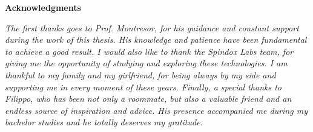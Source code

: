 \thispagestyle{empty}

\begin{center}
  {\bf \Huge Acknowledgments}
\end{center}

\vspace{4cm}


\emph{
The first thanks goes to Prof. Montresor, for his guidance and constant support during the work of this thesis. His knowledge and patience have been fundamental to achieve a good result. I would also like to thank the Spindox Labs team, for giving me the opportunity of studying and exploring these technologies. I am thankful to my family and my girlfriend, for being always by my side and supporting me in every moment of these years. Finally, a special thanks to Filippo, who has been not only a roommate, but also a valuable friend and an endless source of inspiration and advice. His presence accompanied me during my bachelor studies and he totally deserves my gratitude.
}
